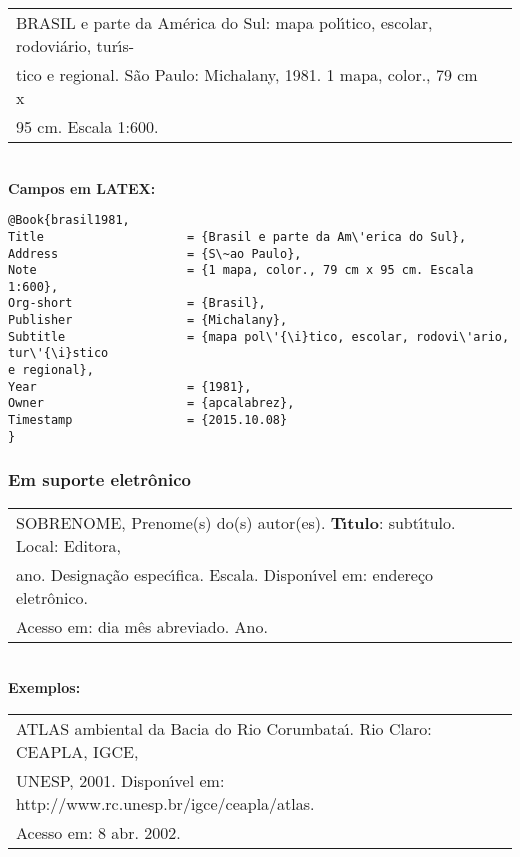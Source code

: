 \begin{tabular}{|l|c|} \hline
	BRASIL e parte da Am\'erica do Sul: mapa pol\'{\i}tico, escolar, rodovi\'ario,
	tur\'{\i}s-\\ 
	tico e regional. S\~ao Paulo: Michalany, 1981. 1 mapa, color., 79 cm x\\
	95 cm. Escala 1:600. 
	\\\hline
\end{tabular} \\

\textbf{Campos em LATEX:} 

\begin{verbatim}
@Book{brasil1981,
Title                    = {Brasil e parte da Am\'erica do Sul},
Address                  = {S\~ao Paulo},
Note                     = {1 mapa, color., 79 cm x 95 cm. Escala 1:600},
Org-short                = {Brasil},
Publisher                = {Michalany},
Subtitle                 = {mapa pol\'{\i}tico, escolar, rodovi\'ario, tur\'{\i}stico 
e regional},
Year                     = {1981},
Owner                    = {apcalabrez},
Timestamp                = {2015.10.08}
}
\end{verbatim}

\subsubsection{Em suporte eletr\^onico}

\begin{tabular}{|l|c|} \hline
	SOBRENOME, Prenome(s) do(s) autor(es). \textbf{T\'{\i}tulo}: subt\'{\i}tulo. Local: Editora,\\
	ano. Designa\c{c}\~ao espec\'{\i}fica. Escala. Dispon\'{\i}vel em: endere\c{c}o eletr\^onico. \\
	Acesso em: dia m\^es abreviado. Ano. 
	\\\hline
\end{tabular} \\

\textbf{Exemplos:} \\

\begin{tabular}{|l|c|} \hline
	ATLAS ambiental da Bacia do Rio Corumbata\'{\i}. Rio Claro: CEAPLA, IGCE,\\
	UNESP, 2001. Dispon\'{\i}vel em: http://www.rc.unesp.br/igce/ceapla/atlas.\\
	Acesso em: 8 abr. 2002. 
	\\\hline
\end{tabular} \\

